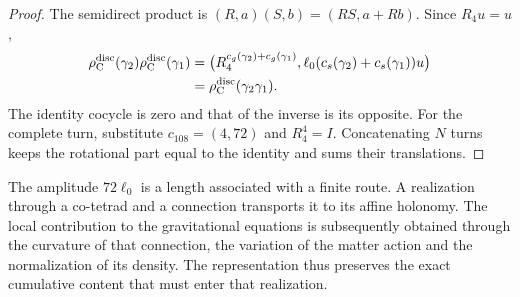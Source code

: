\begin{proof}
The semidirect product is
\((R,a)(S,b)=(RS,a+Rb)\). Since \(R_4u=u\),
\[
\begin{split}
 \rho_{\rm C}^{\rm disc}(\gamma_2)
 \rho_{\rm C}^{\rm disc}(\gamma_1)
 &=
 \bigl(R_4^{c_g(\gamma_2)+c_g(\gamma_1)},
 \ell_0(c_s(\gamma_2)+c_s(\gamma_1))u\bigr)\\
 &=\rho_{\rm C}^{\rm disc}(\gamma_2\gamma_1).
\end{split}
\]
The identity cocycle is zero and that of the inverse is its opposite.
For the complete turn, substitute \(c_{108}=(4,72)\) and
\(R_4^4=I\). Concatenating \(N\) turns keeps the rotational part
equal to the identity and sums their translations.
\end{proof}

The amplitude \(72\ell_0\) is a length associated with a finite route.
A realization through a co-tetrad and a connection transports it to its
affine holonomy. The local contribution to the gravitational equations
is subsequently obtained through the curvature of that connection, the
variation of the matter action and the normalization of its density.
The representation thus preserves the exact cumulative content that
must enter that realization.
